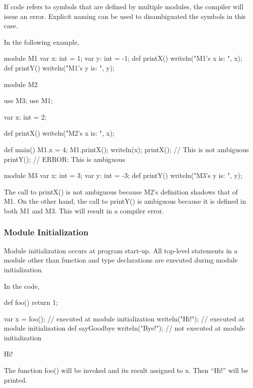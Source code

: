 If code refers to symbols that are defined by multiple modules, the
compiler will issue an error.  Explicit naming can be used to
disambiguated the symbols in this case.

\begin{example}
%
%
%
In the following example,
\begin{chapelpre}
\end{chapelpre}
\begin{chapel}
module M1 {
  var x: int = 1;
  var y: int = -1;
  def printX() {
    writeln("M1's x is: ", x);
  }
  def printY() {
    writeln("M1's y is: ", y);
  }
}
 
module M2 {
  use M3;
  use M1;

  var x: int = 2;

  def printX() {
    writeln("M2's x is: ", x);
  }

  def main() {
    M1.x = 4;
    M1.printX();
    writeln(x);
    printX(); // This is not ambiguous
    printY(); // ERROR: This is ambiguous
  }
}

module M3 {
  var x: int = 3;
  var y: int = -3;
  def printY() {
    writeln("M3's y is: ", y);
  }
}
\end{chapel}
The call to printX() is not ambiguous because M2's definition shadows
that of M1.  On the other hand, the call to printY() is ambiguous
because it is defined in both M1 and M3.  This will result in a
compiler error.


\end{example}


\subsubsection{Module Initialization}
\label{Module_Initialization}

Module initialization occurs at program start-up.  All top-level
statements in a module other than function and type declarations are
executed during module initialization.

\begin{example}
In the code,
\begin{chapelpre}
def foo() {
    return 1;
}
\end{chapelpre}
\begin{chapel}
var x = foo();       // executed at module initialization
writeln("Hi!");      // executed at module initialization
def sayGoodbye {
  writeln("Bye!");   // not executed at module initialization
}
\end{chapel}
\begin{chapeloutput}
Hi!
\end{chapeloutput}
The function foo() will be invoked and its result assigned to x.  Then
``Hi!'' will be printed.
\end{example}

